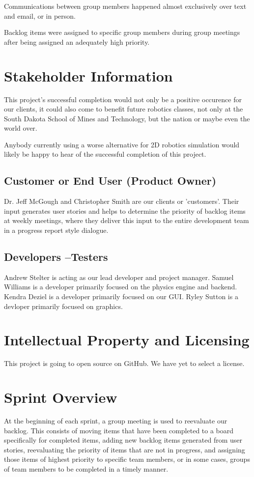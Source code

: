 Communications between group members happened almost exclusively over text and email, or in person.

Backlog items were assigned to specific group members during group meetings after being assigned an adequately high priority.


\section{ Stakeholder Information}
This project's successful completion would not only be a positive occurence for our clients, it could also come to benefit future robotics classes, not only at the South Dakota School of Mines and Technology, but the nation or maybe even the world over.

Anybody currently using a worse alternative for 2D robotics simulation would likely be happy to hear of the successful completion of this project.

\subsection{Customer or End User (Product Owner)}
Dr. Jeff McGough and Christopher Smith are our clients or 'customers'. Their input generates user stories and helps to determine the priority of backlog items at weekly meetings, where they deliver this input to the entire development team in a progress report style dialogue.

\subsection{Developers --Testers}
Andrew Stelter is acting as our lead developer and project manager. Samuel Williams is a developer primarily focused on the physics engine and backend. Kendra Deziel is a developer primarily focused on our GUI. Ryley Sutton is a devloper primarily focused on graphics.

\section{Intellectual Property and Licensing}
This project is going to open source on GitHub. We have yet to select a license. 

\section{Sprint  Overview}
At the beginning of each sprint, a group meeting is used to reevaluate our backlog. This consists of moving items that have been completed to a board specifically for completed items, adding new backlog items generated from user stories, reevaluating the priority of items that are not in progress, and assigning those items of highest priority to specific team members, or in some cases, groups of team members to be completed in a timely manner.

